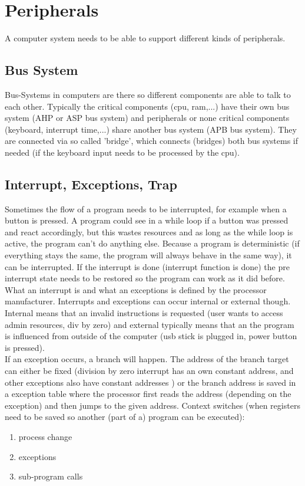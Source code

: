 \documentclass[a4paper]{scrartcl}
\begin{document}
    \section{Peripherals}
        A computer system needs to be able to support different kinds of peripherals. 
            \subsection{Bus System}
            Bus-Systems in computers are there so different components are able to talk to each other. Typically the critical components (cpu, ram,...) have 
            their own bus system (AHP or ASP bus system) and peripherals or none critical components (keyboard, interrupt time,...) share another bus system (APB bus system).
            They are connected via so called 'bridge', which connects (bridges) both bus systems if needed (if the keyboard input needs to be processed by the cpu). 
            \subsection{Interrupt, Exceptions, Trap}
            Sometimes the flow of a program needs to be interrupted, for example when a button is pressed. A program could see in a while loop if a button was pressed and react 
            accordingly, but this wastes resources and as long as the while loop is active, the program can't do anything else. Because a program is deterministic (if everything stays the
            same, the program will always behave in the same way), it can be interrupted. If the interrupt is done (interrupt function is done) the pre interrupt state needs to be 
            restored so the program can work as it did before. \\
            What an interrupt is and what an exceptions is defined by the processor manufacturer. Interrupts and exceptions can occur internal or external though.
            Internal means that an invalid instructions is requested (user wants to access admin resources, div by zero) and external typically means that an 
            the program is influenced from outside of the computer (usb stick is plugged in, power button is pressed). \\
            If an exception occurs, a branch will happen. The address of the branch target can either be fixed (division by zero interrupt has an own constant address, and other
            exceptions also have constant addresses ) or the branch address is saved in a exception table where the processor first reads the address (depending on the exception) 
            and then jumps to the given address.
            Context switches (when registers need to be saved so another (part of a) program can be executed): 
            \begin{enumerate}
                \item process change
                \item exceptions
                \item sub-program calls
            \end{enumerate}   
\end{document}
